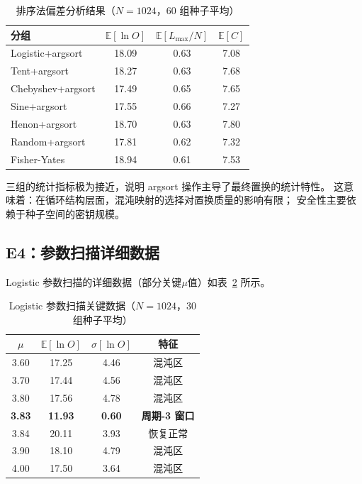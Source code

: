 \documentclass[12pt,a4paper]{ctexrep}
\begin{document}
\begin{table}[H]
  \centering
  \caption{排序法偏差分析结果（$N=1024$，60 组种子平均）}
  \label{tab:sorting}
  \begin{tabular}{lccc}
    \toprule
    分组 & $\mathbb{E}[\ln O]$ & $\mathbb{E}[L_{\max}/N]$ & $\mathbb{E}[C]$ \\
    \midrule
    Logistic+argsort & 18.09 & 0.63 & 7.08 \\
    Tent+argsort & 18.27 & 0.63 & 7.68 \\
    Chebyshev+argsort & 17.49 & 0.65 & 7.65 \\
    Sine+argsort & 17.55 & 0.66 & 7.27 \\
    Henon+argsort & 18.70 & 0.63 & 7.80 \\
    Random+argsort & 17.81 & 0.62 & 7.32 \\
    Fisher-Yates & 18.94 & 0.61 & 7.53 \\
    \bottomrule
  \end{tabular}
\end{table}

三组的统计指标极为接近，说明 argsort 操作主导了最终置换的统计特性。
这意味着：在循环结构层面，混沌映射的选择对置换质量的影响有限；
安全性主要依赖于种子空间的密钥规模。

\subsection{E4：参数扫描详细数据}

Logistic 参数扫描的详细数据（部分关键$\mu$值）如表~\ref{tab:param} 所示。

\begin{table}[H]
  \centering
  \caption{Logistic 参数扫描关键数据（$N=1024$，30 组种子平均）}
  \label{tab:param}
  \begin{tabular}{cccc}
    \toprule
    $\mu$ & $\mathbb{E}[\ln O]$ & $\sigma[\ln O]$ & 特征 \\
    \midrule
    3.60 & 17.25 & 4.46 & 混沌区 \\
    3.70 & 17.44 & 4.56 & 混沌区 \\
    3.80 & 17.56 & 4.78 & 混沌区 \\
    \textbf{3.83} & \textbf{11.93} & \textbf{0.60} & \textbf{周期-3 窗口} \\
    3.84 & 20.11 & 3.93 & 恢复正常 \\
    3.90 & 18.10 & 4.79 & 混沌区 \\
    4.00 & 17.50 & 3.64 & 混沌区 \\
    \bottomrule
  \end{tabular}
\end{table}
\end{document}
